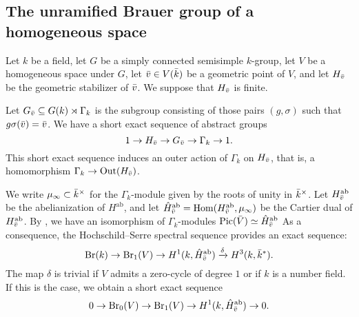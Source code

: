 \documentclass[10pt,letterpaper,twoside]{article}
\renewcommand{\1}{\mathbf{1}}
\newcommand{\Br}{\mathrm{Br}}
\theoremstyle{plain}
\theoremstyle{plain}
\theoremstyle{definition}
\theoremstyle{named}
\theoremstyle{definition}
\begin{document}
\subsection{The unramified Brauer group of a homogeneous space}
Let $k$ be a field, let $G$ be a simply connected semisimple $k$-group, let $V$ be a homogeneous space under $G$, let $\Bar{v}\in V(\Bar{k})$ be a geometric point of $V$, and let $H_{\Bar{v}}$ be the geometric stabilizer of $\Bar{v}$. We suppose that $H_{\Bar{v}}$ is finite.

Let $G_{\Bar{v}} \subseteq G(k) \rtimes \Gamma_k$ is the subgroup consisting of those pairs $(g, \sigma)$ such that $g\sigma(\Bar{v}) = \Bar{v}$. We have a short exact sequence of abstract groups
\[
1 \to H_{\Bar{v}} \to G_{\Bar{v}} \to \Gamma_k \to 1.
\]
This short exact sequence induces an outer action of $\Gamma_k$ on $H_{\Bar{v}}$, that is, a homomorphism $\Gamma_k\to \mathrm{Out}(H_{\Bar{v}})$. 

We write $\mu_{\infty}\subset \Bar{k}^\times$ for the $\Gamma_k$-module given by the roots of unity in $\Bar{k}^\times$. Let $H^{\mathrm{ab}}_{\Bar{v}}$ be the abelianization of  $H^{\mathrm{ab}}$, and let $\hat{H}^{\mathrm{ab}}_{\Bar{v}}= \mathrm{Hom}(H^{\mathrm{ab}}_{\Bar{v}}, \mu_{\infty})$ be the Cartier dual of $H^{\mathrm{ab}}_{\Bar{v}}$. By \cite{}, we have an isomorphism of $\Gamma_k$-modules $\text{Pic}(\Bar{V})\simeq \hat{H}^{\mathrm{ab}}_{\Bar{v}}$ As a consequence, the Hochschild–Serre spectral sequence provides an exact sequence:
\[
\text{Br}(k) \to \text{Br}_1(V) \to H^1(k, \hat{H}^{\mathrm{ab}}_{\Bar{v}}) \xrightarrow{\delta} H^3(k, \bar{k}^*).
\]
The map $\delta$ is trivial if $V$ admits a zero-cycle of degree $1$ or if $k$ is a number field. If this is the case, we obtain a short exact sequence
\[0\to \Br_0(V)\to \Br_1(V)\to H^1(k, \hat{H}^{\mathrm{ab}}_{\Bar{v}})\to 0.\]
\end{document}
